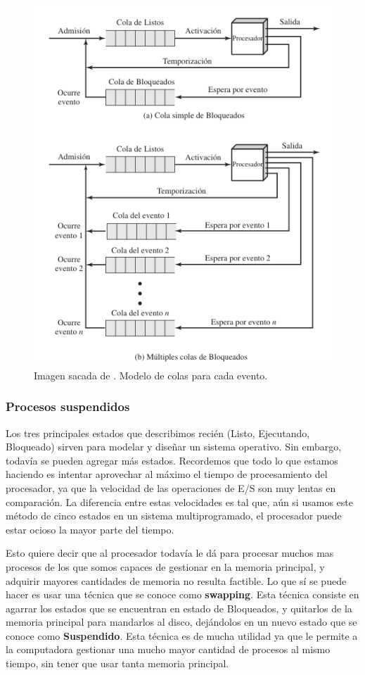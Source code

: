 \documentclass[12pt]{article}
\begin{document}
  \begin{figure}[H]
    \centering
    \includegraphics[width=0.8\linewidth]{imagenes/colas-bloqueados.png}
    \caption{Imagen sacada de \parencite{sostallings}. Modelo de colas para cada evento.}
    \label{fig:colas-eventos}
  \end{figure}

  \subsubsection{Procesos suspendidos}
  Los tres principales estados que describimos recién (Listo, Ejecutando, Bloqueado) sirven para modelar y diseñar un sistema operativo. Sin embargo, todavía se pueden agregar más estados. Recordemos que todo lo que estamos haciendo es intentar aprovechar al máximo el tiempo de procesamiento del procesador, ya que la velocidad de las operaciones de E/S son muy lentas en comparación. La diferencia entre estas velocidades es tal que, aún si usamos este método de cinco estados en un sistema multiprogramado, el procesador puede estar ocioso la mayor parte del tiempo.

  Esto quiere decir que al procesador todavía le dá para procesar muchos mas procesos de los que somos capaces de gestionar en la memoria principal, y adquirir mayores cantidades de memoria no resulta factible. Lo que sí se puede hacer es usar una técnica que se conoce como \textbf{swapping}. Esta técnica consiste en agarrar los estados que se encuentran en estado de Bloqueados, y quitarlos de la memoria principal para mandarlos al disco, dejándolos en un nuevo estado que se conoce como \textbf{Suspendido}. Esta técnica es de mucha utilidad ya que le permite a la computadora gestionar una mucho mayor cantidad de procesos al mismo tiempo, sin tener que usar tanta memoria principal.
\end{document}
